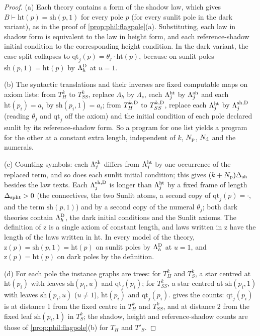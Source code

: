 \begin{proof}
(a) Each theory contains a form of the shadow law, which gives $B\vdash\mathrm{ht}(p)=\mathrm{sh}(p,1)$ for every pole $p$ (for every sunlit pole in the dark variant), as in the proof of \cref{prop:phil:flagpole}(a). Substituting, each law in shadow form is equivalent to the law in height form, and each reference-shadow initial condition to the corresponding height condition. In the dark variant, the case split collapses to $\mathrm{qt}_j(p)=\theta_j\cdot\mathrm{ht}(p)$, because on sunlit poles $\mathrm{sh}(p,1)=\mathrm{ht}(p)$ by $\Lambda^{\rm D}_h$ at $u=1$.

(b) The syntactic translations and their inverses are fixed computable maps on axiom lists: from $T^k_H$ to $T^k_{SS}$, replace $\Lambda_h$ by $\Lambda_s$, each $\Lambda^{\rm ht}_j$ by $\Lambda^{\rm sh}_j$ and each $\mathrm{ht}(p_i)=a_i$ by $\mathrm{sh}(p_i,1)=a_i$; from $T^{k,\rm D}_H$ to $T^{k,\rm D}_{SS}$, replace each $\Lambda^{\rm ht}_j$ by $\Lambda^{\rm sh,D}_j$ (reading $\theta_j$ and $\mathrm{qt}_j$ off the axiom) and the initial condition of each pole declared sunlit by its reference-shadow form. So a program for one list yields a program for the other at a constant extra length, independent of $k$, $N_{\rm p}$, $N_{\rm d}$ and the numerals.

(c) Counting symbols: each $\Lambda^{\rm sh}_j$ differs from $\Lambda^{\rm ht}_j$ by one occurrence of the replaced term, and so does each sunlit initial condition; this gives $(k+N_{\rm p})\Delta_{\rm sh}$ besides the law texts. Each $\Lambda^{\rm sh,D}_j$ is longer than $\Lambda^{\rm ht}_j$ by a fixed frame of length $\Delta_{\rm split}>0$ (the connectives, the two $\mathrm{Sunlit}$ atoms, a second copy of $\mathrm{qt}_j(p)=\cdot$, and the term $\mathrm{sh}(p,1)$) and by a second copy of the numeral $\theta_j$; both dark theories contain $\Lambda^{\rm D}_h$, the dark initial conditions and the $\mathrm{Sunlit}$ axioms. The definition of $\mathrm{z}$ is a single axiom of constant length, and laws written in $\mathrm{z}$ have the length of the laws written in $\mathrm{ht}$. In every model of the theory, $\mathrm{z}(p)=\mathrm{sh}(p,1)=\mathrm{ht}(p)$ on sunlit poles by $\Lambda^{\rm D}_h$ at $u=1$, and $\mathrm{z}(p)=\mathrm{ht}(p)$ on dark poles by the definition.

(d) For each pole the instance graphs are trees: for $T^k_H$ and $T^k_S$, a star centred at $\mathrm{ht}(p_i)$ with leaves $\mathrm{sh}(p_i,u)$ and $\mathrm{qt}_j(p_i)$; for $T^k_{SS}$, a star centred at $\mathrm{sh}(p_i,1)$ with leaves $\mathrm{sh}(p_i,u)$ ($u\ne1$), $\mathrm{ht}(p_i)$ and $\mathrm{qt}_j(p_i)$.  gives the counts: $\mathrm{qt}_j(p_i)$ is at distance $1$ from the fixed centre in $T^k_H$ and $T^k_{SS}$, and at distance $2$ from the fixed leaf $\mathrm{sh}(p_i,1)$ in $T^k_S$; the shadow, height and reference-shadow counts are those of \cref{prop:phil:flagpole}(b) for $T_H$ and $T'_S$.
\end{proof}
